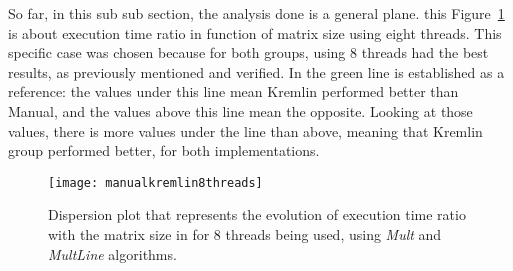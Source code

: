 So far, in this sub sub section, the analysis done is a general plane. this Figure~\ref{fig:manualkremlin8threads} is about execution time ratio in function of matrix size using eight threads. This specific case was chosen because for both groups, using 8 threads had the best results, as previously mentioned and verified. In the green line is established as a reference: the values under this line mean Kremlin performed better than Manual, and the values above this line mean the opposite. Looking at those values, there is more values under the line than above, meaning that Kremlin group performed better, for both implementations. 
\begin{figure}[htb]
	\begin{center}
		\leavevmode
		\texttt{[image: manualkremlin8threads]}
		\caption{Dispersion plot that represents the evolution of execution time ratio with the matrix size in for 8 threads being used, using \textit{Mult} and \textit{MultLine} algorithms.}
		\label{fig:manualkremlin8threads}
	\end{center}
\end{figure}

